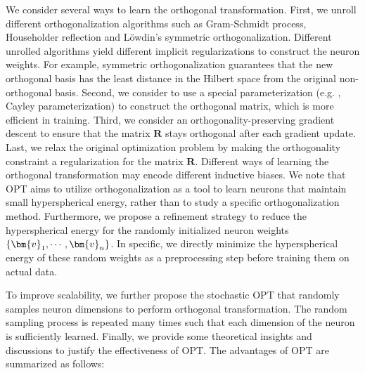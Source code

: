 We consider several ways to learn the orthogonal transformation. First, we unroll different orthogonalization algorithms such as Gram-Schmidt process, Householder reflection and Löwdin's symmetric orthogonalization. Different unrolled algorithms yield different implicit regularizations to construct the neuron weights. For example, symmetric orthogonalization guarantees that the new orthogonal basis has the least distance in the Hilbert space from the original non-orthogonal basis. Second, we consider to use a special parameterization (e.g. , Cayley parameterization) to construct the orthogonal matrix, which is more efficient in training. Third, we consider an orthogonality-preserving gradient descent to ensure that the matrix $\bm{R}$ stays orthogonal after each gradient update. Last, we relax the original optimization problem by making the orthogonality constraint a regularization for the matrix $\bm{R}$. Different ways of learning the orthogonal transformation may encode different inductive biases. We note that OPT aims to utilize orthogonalization as a tool to learn neurons that maintain small hyperspherical energy, rather than to study a specific orthogonalization method. Furthermore, we propose a refinement strategy to reduce the hyperspherical energy for the randomly initialized neuron weights $\thickmuskip=2mu \medmuskip=2mu \{\bm{v}_1,\cdots,\bm{v}_n\}$. In specific, we directly minimize the hyperspherical energy of these random weights as a preprocessing step before training them on actual data.

To improve scalability, we further propose the stochastic OPT that randomly samples neuron dimensions to perform orthogonal transformation. The random sampling process is repeated many times such that each dimension of the neuron is sufficiently learned. Finally, we provide some theoretical insights and discussions to justify the effectiveness of OPT. The advantages of OPT are summarized as follows:

